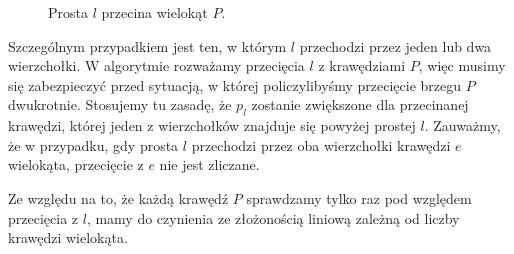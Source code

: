 \begin{figure}[htp]
  \centering
  \caption{Prosta $l$ przecina wielokąt $P$.\label{fig:location2}}
\end{figure}

Szczególnym przypadkiem jest ten, w którym $l$ przechodzi przez jeden
lub dwa wierzchołki. W algorytmie rozważamy przecięcia $l$ z
krawędziami $P$, więc musimy się zabezpieczyć przed sytuacją, w której
policzylibyśmy przecięcie brzegu $P$ dwukrotnie. Stosujemy tu zasadę,
że $p_l$ zostanie zwiększone dla przecinanej krawędzi, której jeden z
wierzchołków znajduje się powyżej prostej $l$. Zauważmy, że w
przypadku, gdy prosta $l$ przechodzi przez oba wierzchołki krawędzi
$e$ wielokąta, przecięcie z $e$ nie jest zliczane.

Ze względu na to, że każdą krawędź $P$ sprawdzamy tylko raz
pod względem przecięcia z $l$, mamy do czynienia ze złożonością
liniową zależną od liczby krawędzi wielokąta.

